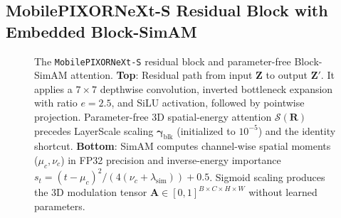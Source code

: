 \subsection{MobilePIXORNeXt-S Residual Block with Embedded Block-SimAM}
\label{sec:next_s_block}

\begin{figure}[t]
    \centering
    \caption{The \texttt{MobilePIXORNeXt-S} residual block and parameter-free Block-SimAM attention. \textbf{Top}: Residual path from input $\mathbf{Z}$ to output $\mathbf{Z}'$. It applies a $7 \times 7$ depthwise convolution, inverted bottleneck expansion with ratio $e = 2.5$, and SiLU activation, followed by pointwise projection. Parameter-free 3D spatial-energy attention $\mathcal{S}(\mathbf{R})$ precedes LayerScale scaling $\boldsymbol{\gamma}_{\mathrm{blk}}$ (initialized to $10^{-5}$) and the identity shortcut. \textbf{Bottom}: SimAM computes channel-wise spatial moments ($\mu_c, \nu_c$) in FP32 precision and inverse-energy importance $s_t = (t - \mu_c)^2 / (4(\nu_c + \lambda_{\mathrm{sim}})) + 0.5$. Sigmoid scaling produces the 3D modulation tensor $\mathbf{A} \in [0, 1]^{B \times C \times H \times W}$ without learned parameters.}
    \label{fig:next_s_block}
\end{figure}


